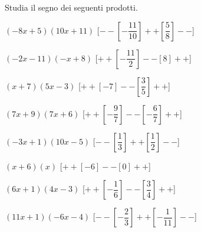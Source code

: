 \begin{esercizio}\label{ese:dis_5}
 Studia il segno dei seguenti prodotti.
 \begin{enumeratea}
  \item  $\left(-8 x +5\right)\left(10 x +11\right)$ \hfill 
  [$--\left [-\dfrac{11}{10} \right ]++\left [\dfrac{5}{8} \right ]--$]
  \item  $\left(-2 x -11\right)\left(- x +8\right)$ \hfill 
  [$++\left [-\dfrac{11}{2} \right ]--\left [8 \right ]++$]
  \item  $\left(x +7\right)\left(5 x -3\right)$ \hfill 
  [$++\left [-7 \right ]--\left [\dfrac{3}{5} \right ]++$]
  \item  $\left(7 x +9\right)\left(7 x +6\right)$ \hfill 
  [$++\left [-\dfrac{9}{7} \right ]--\left [-\dfrac{6}{7} \right ]++$]
  \item  $\left(-3 x +1\right)\left(10 x -5\right)$ \hfill 
  [$--\left [\dfrac{1}{3} \right ]++\left [\dfrac{1}{2} \right ]--$]
  \item  $\left(x +6\right)\left(x \right)$ \hfill 
  [$++\left [-6 \right ]--\left [0 \right ]++$]
  \item  $\left(6 x +1\right)\left(4 x -3\right)$ \hfill 
  [$++\left [-\dfrac{1}{6} \right ]--\left [\dfrac{3}{4} \right ]++$]
  \item  $\left(11 x +1\right)\left(-6 x -4\right)$ \hfill 
  [$--\left [-\dfrac{2}{3} \right ]++\left [-\dfrac{1}{11} \right ]--$]
 \end{enumeratea}
\end{esercizio}

